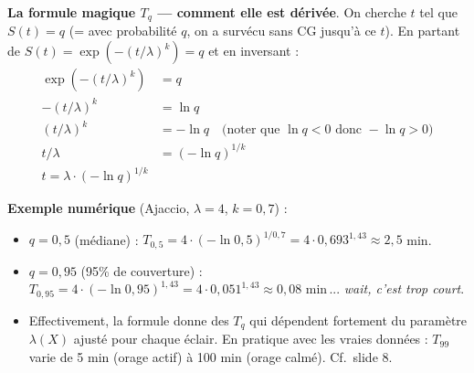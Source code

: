 \documentclass[11pt,a4paper]{article}
\begin{document}
\begin{compr}
\textbf{La formule magique $T_q$ — comment elle est dérivée}. On cherche $t$ tel que
$S(t) = q$ (= avec probabilité $q$, on a survécu sans CG jusqu'à ce $t$). En partant de
$S(t) = \exp(-(t/\lambda)^k) = q$ et en inversant :
\begin{align*}
\exp(-(t/\lambda)^k) &= q \\
-(t/\lambda)^k &= \ln q \\
(t/\lambda)^k &= -\ln q \quad \text{(noter que } \ln q < 0 \text{ donc } -\ln q > 0\text{)} \\
t/\lambda &= (-\ln q)^{1/k} \\
\boxed{t = \lambda \cdot (-\ln q)^{1/k}}
\end{align*}

\textbf{Exemple numérique} (Ajaccio, $\lambda = 4$, $k = 0{,}7$) :
\begin{itemize}[topsep=2pt]
    \item $q = 0{,}5$ (médiane) : $T_{0,5} = 4 \cdot (-\ln 0{,}5)^{1/0,7} = 4 \cdot 0{,}693^{1,43} \approx 2{,}5$ min.
    \item $q = 0{,}95$ (95\% de couverture) : $T_{0,95} = 4 \cdot (-\ln 0{,}95)^{1,43} = 4 \cdot 0{,}051^{1,43} \approx 0{,}08$ min$\,$... \emph{wait, c'est trop court}.
    \item Effectivement, la formule donne des $T_q$ qui dépendent fortement du paramètre $\lambda(X)$
    ajusté pour chaque éclair. En pratique avec les vraies données : $T_{99}$ varie de 5 min
    (orage actif) à 100 min (orage calmé). Cf.\ slide 8.
\end{itemize}
\end{compr}
\end{document}
